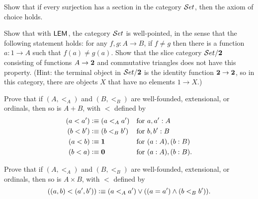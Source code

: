 \documentclass[hott-all.tex]{subfiles}
\begin{document}
% 
\begin{ex}
  Show that if every surjection has a section in the category $\mathcal{S}et$, then the axiom of choice holds.
\end{ex}
% 
\begin{ex}
  Show that with $\mathsf{LEM}_{}$, the category $\mathcal{S}et$ is well-pointed,
  in the sense that the following statement holds: for any $f, g : A\to B$, if $f \neq g$ then there is a function $a : 1\to A$ such that $f(a) \neq g(a)$.
  Show that the slice category
  $\mathcal{S}et/\mathbf{2}$ consisting of functions $A\to \mathbf{2}$ and commutative triangles does not have this property.
  (Hint: the terminal object in $\mathcal{S}et/\mathbf{2}$ is the identity function $\mathbf{2} \to \mathbf{2}$, so in this category, there are objects $X$ that have no elements $1\to X$.)
\end{ex}
% 
\begin{ex}
  Prove that if $(A,<_A)$ and $(B,<_B)$ are well-founded, extensional, or ordinals, then so is $A+B$, with $<$ defined by
  \begin{align*}
    (a<a') &\vcentcolon\equiv (a<_A a') & \text{for }& a,a':A\\
    (b<b') &\vcentcolon\equiv (b<_B b') & \text{for }& b,b':B\\
    (a<b) &\vcentcolon\equiv \mathbf{1}      & \text{for }& (a:A),(b:B)\\
    (b<a) &\vcentcolon\equiv \mathbf{0}    & \text{for }& (a:A),(b:B).
  \end{align*}
\end{ex}
% 
\begin{ex}
  Prove that if $(A,<_A)$ and $(B,<_B)$ are well-founded, extensional, or ordinals, then so is $A\times B$, with $<$ defined by
  \[ ((a,b) <(a',b')) \vcentcolon\equiv (a<_A a') \vee ((a=a') \wedge (b<_B b')). \]
\end{ex}
\end{document}
